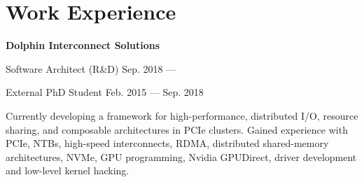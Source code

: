 \section{Work Experience}
\parbox[t][][t]{\linewidth}{
	\parbox{\linewidth}{\textbf{Dolphin Interconnect Solutions}}
	\smallbreak
	\smallskip
	{\hfill\parbox{\linewidth}{
		\parbox{\linewidth}{
			{Software Architect (R\&D)}
			\hfill
			{Sep. 2018 --- \phantom{XXX. 0000}}
		}
		\smallbreak
		\parbox{\linewidth}{
			{External PhD Student}
			\hfill
			{Feb. 2015 --- {Sep. 2018}}
		}
	}}

	
	\bigskip
	Currently developing a framework for high-performance, distributed I/O, resource sharing,
	and composable architectures in PCIe clusters.
	Gained experience with PCIe, NTBs, high-speed interconnects, RDMA, distributed shared-memory
	architectures, NVMe, GPU programming, Nvidia GPUDirect, driver development and low-level kernel hacking.

}
